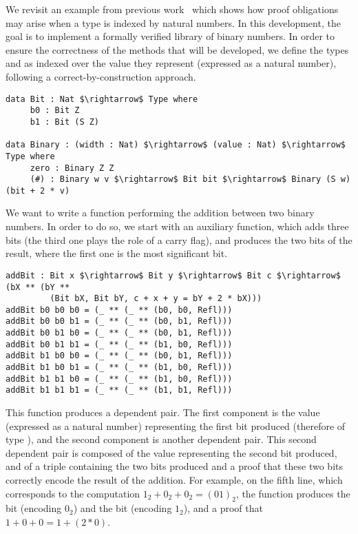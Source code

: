 We revisit an example from previous work~\cite{DBLP:conf/plpv/Brady13} which shows how proof obligations may arise when a type is indexed by natural numbers. In this development, the goal is to implement a formally verified library of binary numbers. In order to ensure the correctness of the methods that will be developed, we define the types  and  as indexed over the value they represent (expressed as a natural number), following a correct-by-construction approach.

\begin{lstlisting}
data Bit : Nat $\rightarrow$ Type where
     b0 : Bit Z
     b1 : Bit (S Z)
     
data Binary : (width : Nat) $\rightarrow$ (value : Nat) $\rightarrow$ Type where
     zero : Binary Z Z
     (#) : Binary w v $\rightarrow$ Bit bit $\rightarrow$ Binary (S w) (bit + 2 * v)
\end{lstlisting}

We want to write a function performing the addition between two binary numbers. In order to do so, we start with an auxiliary function, which adds three bits
(the third one plays the role of a carry flag), and produces the two bits of
the result, where the first one is the most significant bit. 

\begin{lstlisting}
addBit : Bit x $\rightarrow$ Bit y $\rightarrow$ Bit c $\rightarrow$ (bX ** (bY ** 
         (Bit bX, Bit bY, c + x + y = bY + 2 * bX)))
addBit b0 b0 b0 = (_ ** (_ ** (b0, b0, Refl)))
addBit b0 b0 b1 = (_ ** (_ ** (b0, b1, Refl)))
addBit b0 b1 b0 = (_ ** (_ ** (b0, b1, Refl)))
addBit b0 b1 b1 = (_ ** (_ ** (b1, b0, Refl)))
addBit b1 b0 b0 = (_ ** (_ ** (b0, b1, Refl)))
addBit b1 b0 b1 = (_ ** (_ ** (b1, b0, Refl)))
addBit b1 b1 b0 = (_ ** (_ ** (b1, b0, Refl)))
addBit b1 b1 b1 = (_ ** (_ ** (b1, b1, Refl)))
\end{lstlisting}

This function produces a dependent pair. The first component is the value  (expressed as a natural number) representing the first bit produced (therefore of type ), and the second component is another dependent pair. This second dependent pair is composed of the value  representing the second bit produced, and of a triple containing the two bits produced and a proof that these two bits correctly encode the result of the addition.
For example, on the fifth line, which corresponds to the computation $1_2 + 0_2 + 0_2 = (01)_2$, the function produces the bit  (encoding $0_2$) and the bit  (encoding $1_2$), and a proof that $1 + 0 + 0 = 1 + (2*0)$.

